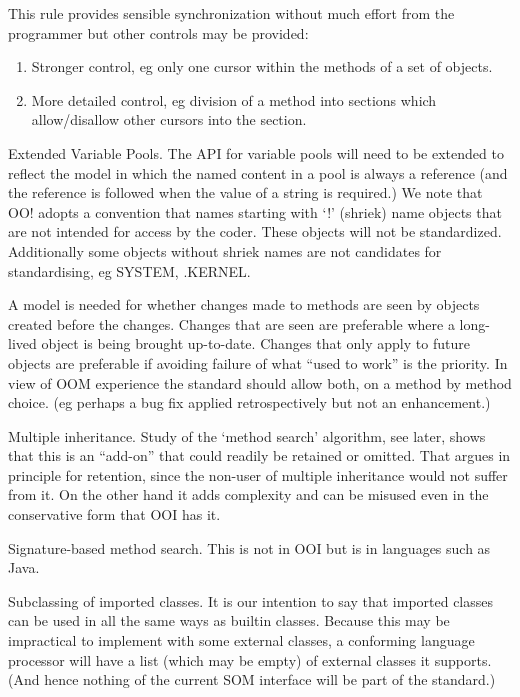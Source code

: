 This rule provides sensible synchronization without much effort from the
programmer but other controls may be provided:

\begin{enumerate}
\def\labelenumi{\alph{enumi})}
\item
  Stronger control, eg only one cursor within the methods of a set of
  objects.
\item
  More detailed control, eg division of a method into sections which
  allow/disallow other cursors into the section.
\end{enumerate}

Extended Variable Pools. The API for variable pools will need to be
extended to reflect the model in which the named content in a pool is
always a reference (and the reference is followed when the value of a
string is required.) We note that OO! adopts a convention that names
starting with `!' (shriek) name objects that are not intended for access
by the coder. These objects will not be standardized. Additionally some
objects without shriek names are not candidates for standardising, eg
SYSTEM, .KERNEL.

A model is needed for whether changes made to methods are seen by
objects created before the changes. Changes that are seen are preferable
where a long-lived object is being brought up-to-date. Changes that only
apply to future objects are preferable if avoiding failure of what
``used to work'' is the priority. In view of OOM experience the standard
should allow both, on a method by method choice. (eg perhaps a bug fix
applied retrospectively but not an enhancement.)

Multiple inheritance. Study of the `method search' algorithm, see later,
shows that this is an ``add-on'' that could readily be retained or
omitted. That argues in principle for retention, since the non-user of
multiple inheritance would not suffer from it. On the other hand it adds
complexity and can be misused even in the conservative form that OOI has
it.

Signature-based method search. This is not in OOI but is in languages
such as Java.

Subclassing of imported classes. It is our intention to say that
imported classes can be used in all the same ways as builtin classes.
Because this may be impractical to implement with some external classes,
a conforming language processor will have a list (which may be empty) of
external classes it supports. (And hence nothing of the current SOM
interface will be part of the standard.)

